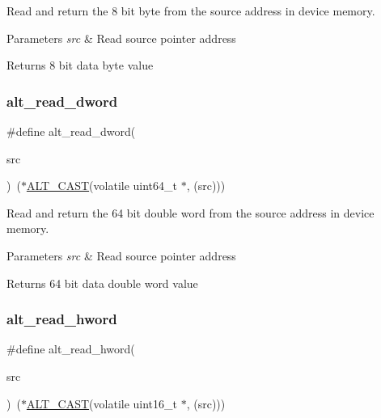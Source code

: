 Read and return the 8 bit byte from the source address in device memory. 
\begin{DoxyParams}{Parameters}
{\em src} & Read source pointer address \\
\hline
\end{DoxyParams}
\begin{DoxyReturn}{Returns}
8 bit data byte value 
\end{DoxyReturn}
\mbox{\label{group__ALT__SOCAL__UTIL__RW__FUNC_gad66f5bf6cf73c5ba348a7ab118bcd2a0}} 
\subsubsection{\texorpdfstring{alt\_read\_dword}{alt\_read\_dword}}
{\footnotesize\ttfamily \#define alt\+\_\+read\+\_\+dword(\begin{DoxyParamCaption}\item[{}]{src }\end{DoxyParamCaption})~($\ast$\mbox{\hyperlink{group__ALT__SOCAL__UTIL_ga0c0d803769fc22ce2c319fc475febbde}{A\+L\+T\+\_\+\+C\+A\+ST}}(volatile uint64\+\_\+t $\ast$, (src)))}

Read and return the 64 bit double word from the source address in device memory. 
\begin{DoxyParams}{Parameters}
{\em src} & Read source pointer address \\
\hline
\end{DoxyParams}
\begin{DoxyReturn}{Returns}
64 bit data double word value 
\end{DoxyReturn}
\mbox{\label{group__ALT__SOCAL__UTIL__RW__FUNC_gaae69946769b67a9b8bf4f57143b1c4d7}} 
\subsubsection{\texorpdfstring{alt\_read\_hword}{alt\_read\_hword}}
{\footnotesize\ttfamily \#define alt\+\_\+read\+\_\+hword(\begin{DoxyParamCaption}\item[{}]{src }\end{DoxyParamCaption})~($\ast$\mbox{\hyperlink{group__ALT__SOCAL__UTIL_ga0c0d803769fc22ce2c319fc475febbde}{A\+L\+T\+\_\+\+C\+A\+ST}}(volatile uint16\+\_\+t $\ast$, (src)))}

